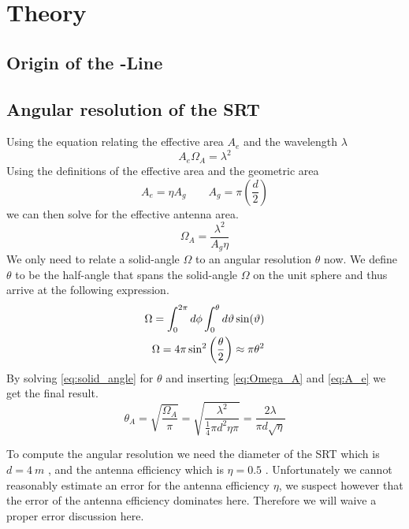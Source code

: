 \section{Theory}




\subsection[Origin of the HI-Line]{Origin of the -Line}

\subsection{Angular resolution of the SRT}\label{sec:ang_res}
Using the equation relating the effective area $A_e$ and the wavelength $\lambda$ \cite[p. 149 (7.11)]{wilson}
\begin{equation}
    A_e \Omega_A = \lambda^2
\end{equation}
Using the definitions of the effective area and the geometric area
\begin{equation}
    A_e = \eta A_g \qquad A_g = \pi \left( \frac{d}{2} \right) \label{eq:A_e}
\end{equation}
we can then solve for the effective antenna area.
\begin{equation}
    \Omega_A = \frac{\lambda^2}{A_g \eta} \label{eq:Omega_A}
\end{equation}
We only need to relate a solid-angle $\Omega$ to an angular resolution $\theta$ now. We define $\theta$ to be the half-angle that spans the solid-angle $\Omega$ on the unit sphere and thus arrive at the following expression.
\begin{align}
    \Omega = \int_{0}^{2\pi} d\phi \int_{0}^{\theta} d\vartheta \sin(\vartheta) \notag \\
    \Omega = 4 \pi \sin^2 \left( \frac{\theta}{2} \right) \approx \pi \theta^2 \label{eq:solid_angle}
\end{align}
By solving \eqref{eq:solid_angle} for $\theta$ and inserting \eqref{eq:Omega_A} and \eqref{eq:A_e} we get the final result.
\begin{equation}
    \theta_A = \sqrt{\frac{\Omega_A}{\pi}} = \sqrt{\frac{\lambda^2}{\frac{1}{4} \pi d^2 \eta \pi}} = \frac{2\lambda}{\pi d \sqrt{\eta}} \label{eq:half_angle}
\end{equation}

To compute the angular resolution we need the diameter of the SRT which is $d = \SI{4}{m}$ \cite[p. 4]{srt}, and the antenna efficiency which is $\eta = 0.5$ \cite[p. 2]{srt}.
Unfortunately we cannot reasonably estimate an error for the antenna efficiency $\eta$, we suspect however that the error of the antenna efficiency dominates here.
Therefore we will waive a proper error discussion here.

